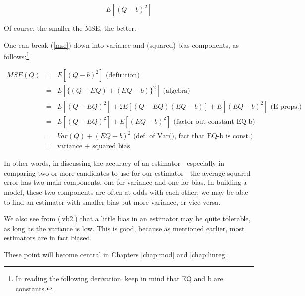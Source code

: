 \begin{equation}
\label{mse}
E[(Q-b)^2]
\end{equation}

Of course, the smaller the MSE, the better.

One can break (\ref{mse}) down into variance and (squared) bias
components, as follows:\footnote{In reading the following derivation,
keep in mind that EQ and b are constants.}

\begin{eqnarray}
MSE(Q) &=& E[(Q-b)^2] \textrm{  (definition)} \\
&=& E[\{(Q-EQ) + (EQ - b)\}^2] \textrm{  (algebra)} \\
&=& E[(Q-EQ)^2] + 2 E \left [ (Q-EQ) (EQ-b) \right ] + E[ (EQ - b)^2 ]
\textrm{  (E props.)} \\
&=& E[(Q-EQ)^2] + E[ (EQ - b)^2 ] \textrm{  (factor out constant EQ-b)} \\
&=&  Var(Q) + (EQ - b)^2 
\textrm{  (def. of Var(), fact that EQ-b is const.)} 
\label{mseformula}\\
&=& \textrm{variance + squared bias} 
\label{vb2}
\end{eqnarray}

In other words, in discussing the accuracy of an estimator---especially
in comparing two or more candidates to use for our estimator---the
average squared error has two main components, one for variance and one
for bias.  In building a model, these two components are often at odds
with each other; we may be able to find an estimator with smaller bias
but more variance, or vice versa.

We also see from (\ref{vb2}) that a little bias in an estimator
may be quite tolerable, as long as the variance is low.  This is good,
because as mentioned earlier, most estimators are in fact biased.

These point will become central in Chapters \ref{chap:mod} and
\ref{chap:linreg}.


